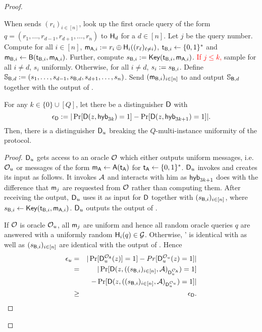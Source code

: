 \begin{proof}
\begin{description}
When \Adv sends $(r_i)_{i\in[n]}$, look up the first oracle query of the form $q= (r_1,\dots, r_{d-1},r_{d+1},\dots, r_{n})$ to $\mathsf{H}_d$ for a $d\in[n]$. Let $j$ be the query number. Compute for all $i\in[n]$, $\mathsf{m}_{\mathsf{A},i}:=r_i\oplus\mathsf{H}_i((r_\ell)_{\ell\neq i})$, $\mathsf{t}_{\mathsf{B},i}\leftarrow\{0,1\}^*$ and $\mathsf{m}_{\mathsf{B},i}\leftarrow\mathsf{B}(\mathsf{t}_{\mathsf{B},i},\mathsf{m}_{\mathsf{A},i})$. Further, compute $s_{\mathsf{B},i}:=\mathsf{Key}(\mathsf{t}_{\mathsf{B},i},\mathsf{m}_{\mathsf{A},i})$. \textcolor{red}{If $j\leq k$,} sample for all $i\neq d$, $s_i$ uniformly. Otherwise, for all $i\neq d$, $s_i:=s_{\mathsf{B},i}$.   Define $\mathsf{\mathbb S}_{\mathsf{B},d}:=(s_{1},\dots, s_{d-1},s_{\mathsf{B},d},s_{d+1},\dots, s_{n})$.  
 Send $(\mathsf{m}_{\mathsf{B},i})_{i\in[n]}$ to \Adv and output $\mathsf{\mathbb S}_{\mathsf{B},d}$ together with the output of \Adv. 
\end{description}

\begin{claim}\label{claim:first}
For any $k\in\{0\}\cup[Q]$, let there be a distinguisher $\mathsf D$ with
$$
\epsilon_{\mathsf D}:=|\Pr[\mathsf D(z,\mathsf{hyb}_{3k})=1] -\Pr[\mathsf D(z,\mathsf{hyb}_{3k+1})=1]|.
$$
Then, there is a distinguisher $\mathsf D_u$ breaking the $Q$-multi-instance uniformity of the \UKA protocol.
\end{claim}

\begin{proof}
 $\mathsf D_u$ gets access to an oracle $\mathcal{O}$ which either outputs uniform messages, i.e. $\mathcal{O}_u$ or messages of  the form $\mathsf{m}_\mathsf{A}\leftarrow\mathsf{A}(\mathsf{t}_\mathsf{A})$ for $\mathsf{t}_\mathsf{A}\leftarrow\{0,1\}^*$. $\mathsf D_u$ invokes \D and creates its input as follows. It invokes $\mathcal{A}$ and interacts with him as $\mathsf{hyb}_{3k+1}$ does with the difference that $\mathsf{m}_j$ are requested from $\mathcal{O}$ rather than computing them.  After receiving the output, $\mathsf D_u$ uses it as input for $\mathsf D$ together with $(s_{\mathsf{B},i})_{i\in[n]}$, where $s_{\mathsf{B},i}\leftarrow\mathsf{Key}(\mathsf{t}_{\mathsf{B},i},\mathsf{m}_{\mathsf{A},i})$. $\mathsf D_u$ outputs the output of \D. 

If $\mathcal{O}$ is oracle $\mathcal{O}_{u}$, all $\mathsf{m}_j$ are uniform and hence all random oracle queries $q$ are answered with a uniformly random $\mathsf{H}_i(q)\in\mathcal{G}$.  Otherwise, \Adv' is identical with \send as well as $(s_{\mathsf{B},i})_{i\in[n]}$ are identical with the output of \send.  
Hence 
\begin{eqnarray*}
\epsilon_{u}&=&|\Pr[\mathsf D_u^{\mathcal{O}_{\mathsf{A}}}(z)]=1]-Pr[\mathsf D_u^{\mathcal{O}_{u}}(z)=1]|\\
&= &|\Pr[\mathsf D(z,((s_{\mathsf{B},i})_{i\in[n]},\mathcal{A})_{\mathsf D_u^{\mathcal{O}_{\mathsf{A}}}})=1]\\
&&-\Pr[\mathsf D(z,((s_{\mathsf{B},i})_{i\in[n]},\mathcal{A})_{\mathsf D_u^{\mathcal{O}_{u}}})=1]|\\
&\geq&\epsilon_{\mathsf D}.
\end{eqnarray*}
\pe
\end{proof}



\end{proof}

